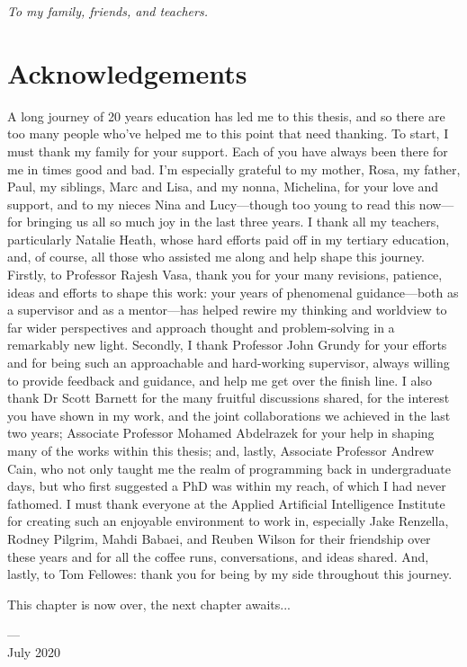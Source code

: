 \cleardoublepage
\pagestyle{empty}
\begin{center}
  \vspace*{0.3\paperheight}
  \textit{To my family, friends, and teachers.}
\end{center}
\pagestyle{fancy}

\chapter*{Acknowledgements}

\vspace{-2\bigskipamount}

A long journey of 20 years education has led me to this thesis, and so there are too many people who've helped me to this point that need thanking. To start, I must thank my family for your support. Each of you have always been there for me in times good and bad. I'm especially grateful to my mother, Rosa, my father, Paul, my siblings, Marc and Lisa, and my nonna, Michelina, for your love and support, and to my nieces Nina and Lucy---though too young to read this now---for bringing us all so much joy in the last three years. I thank all my teachers, particularly Natalie Heath, whose hard efforts paid off in my tertiary education, and, of course, all those who assisted me along and help shape this journey. Firstly, to Professor Rajesh Vasa, thank you for your many revisions, patience, ideas and efforts to shape this work: your years of phenomenal guidance---both as a supervisor and as a mentor---has helped rewire my thinking and worldview to far wider perspectives and approach thought and problem-solving in a remarkably new light. Secondly, I thank Professor John Grundy for your efforts and for being such an approachable and hard-working supervisor, always willing to provide feedback and guidance, and help me get over the finish line. I also thank Dr Scott Barnett for the many fruitful discussions shared, for the interest you have shown in my work, and the joint collaborations we achieved in the last two years; Associate Professor Mohamed Abdelrazek for your help in shaping many of the works within this thesis; and, lastly, Associate Professor Andrew Cain, who not only taught me the realm of programming back in undergraduate days, but who first suggested a PhD was within my reach, of which I had never fathomed. I must thank everyone at the Applied Artificial Intelligence Institute for creating such an enjoyable environment to work in, especially Jake Renzella, Rodney Pilgrim, Mahdi Babaei, and Reuben Wilson for their friendship over these years and for all the coffee runs, conversations, and ideas shared. And, lastly, to Tom Fellowes: thank you for being by my side throughout this journey. 

\bigskip
\noindent
This chapter is now over, the next chapter awaits...

\bigskip
\noindent
\hspace{\fill}
\parbox[b]{0.4\linewidth}{
\raggedleft
\small
--- \theauthor{}\\
July 2020
}